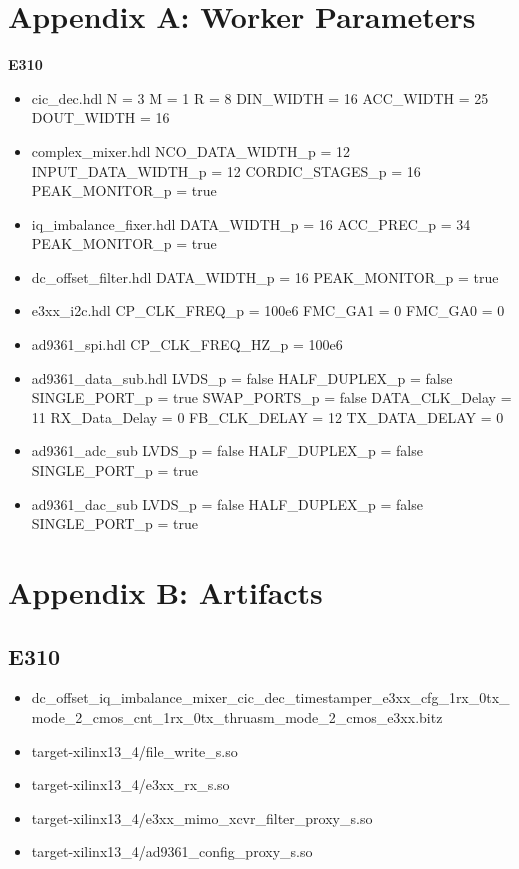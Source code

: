 \section{Appendix A: Worker Parameters}
\begin{minipage}[t]{.5\textwidth}
	\textbf{E310}
	\begin{itemize}
		\item cic\_dec.hdl
			\subitem N = 3
			\subitem M = 1
			\subitem R = 8
			\subitem DIN\_WIDTH = 16
			\subitem ACC\_WIDTH = 25
			\subitem DOUT\_WIDTH = 16
		\item complex\_mixer.hdl
			\subitem NCO\_DATA\_WIDTH\_p = 12
			\subitem INPUT\_DATA\_WIDTH\_p = 12
			\subitem CORDIC\_STAGES\_p = 16
			\subitem PEAK\_MONITOR\_p = true
		\item iq\_imbalance\_fixer.hdl
			\subitem DATA\_WIDTH\_p = 16
			\subitem ACC\_PREC\_p = 34
			\subitem PEAK\_MONITOR\_p = true
		\item dc\_offset\_filter.hdl
			\subitem DATA\_WIDTH\_p = 16
			\subitem PEAK\_MONITOR\_p = true
		\item e3xx\_i2c.hdl
			\subitem CP\_CLK\_FREQ\_p = 100e6
			\subitem FMC\_GA1 = 0
			\subitem FMC\_GA0 = 0
		\item ad9361\_spi.hdl
			\subitem CP\_CLK\_FREQ\_HZ\_p = 100e6
		\item ad9361\_data\_sub.hdl
			\subitem LVDS\_p = false
			\subitem HALF\_DUPLEX\_p = false
			\subitem SINGLE\_PORT\_p = true
			\subitem SWAP\_PORTS\_p = false
			\subitem DATA\_CLK\_Delay = 11
			\subitem RX\_Data\_Delay = 0
			\subitem FB\_CLK\_DELAY = 12
			\subitem TX\_DATA\_DELAY = 0
		\item ad9361\_adc\_sub
			\subitem LVDS\_p = false
			\subitem HALF\_DUPLEX\_p = false
			\subitem SINGLE\_PORT\_p = true
		\item ad9361\_dac\_sub
			\subitem LVDS\_p = false
			\subitem HALF\_DUPLEX\_p = false
			\subitem SINGLE\_PORT\_p = true
	\end{itemize}
\end{minipage} \newpage
\section{Appendix B: Artifacts}
\subsection{E310}
	\begin{itemize}
	\item dc\_offset\_iq\_imbalance\_mixer\_cic\_dec\_timestamper\_e3xx\_cfg\_1rx\_0tx\_mode\_2\_cmos\_cnt\_1rx\_0tx\_thruasm\_mode\_2\_cmos\_e3xx.bitz
	\item target-xilinx13\_4/file\_write\_s.so
	\item target-xilinx13\_4/e3xx\_rx\_s.so
	\item target-xilinx13\_4/e3xx\_mimo\_xcvr\_filter\_proxy\_s.so
	\item target-xilinx13\_4/ad9361\_config\_proxy\_s.so
	\end{itemize}

